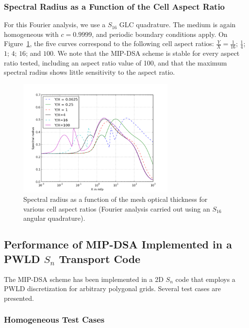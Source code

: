 \documentclass[preprint,10pt]{elsarticle}
\renewcommand{\(}{\left(}
\renewcommand{\)}{\right)}
\renewcommand{\[}{\left[}
\renewcommand{\]}{\right]}
\newcommand{\sn}{\ensuremath{S_n}\xspace}
\begin{document}
\subsubsection{Spectral Radius as a Function of the Cell Aspect Ratio}
For this Fourier analysis, we use a $S_{16}$ GLC quadrature. The medium is
again homogeneous with $c=0.9999$, and periodic boundary conditions apply. 
On Figure~\ref {fig_fa_ar}, the five curves correspond to the following cell aspect 
ratios: $\frac{Y}{X}=\frac{1}{16}$; $\frac{1}{4}$;
$1$; $4$; $16$; and $100$.
We note that the MIP-DSA scheme is stable for every aspect ratio tested, including an
aspect ratio value of 100, 
and that the maximum spectral radius shows little sensitivity to the aspect ratio.
\begin{figure}[!htbp]
  \centering
  \includegraphics[width=0.7\textwidth]{aspect_ratio_9999_2}
  \caption{Spectral radius as a function of the mesh optical thickness for various cell aspect ratios (Fourier analysis carried out using an $S_{16}$ angular quadrature).}
  \label{fig_fa_ar}
\end{figure}

\subsection{Performance of MIP-DSA Implemented in a PWLD $S_n$ Transport Code}
The MIP-DSA scheme has been implemented in a 2D \sn code that employs a PWLD discretization
for arbitrary polygonal grids. Several test cases are presented.

\subsubsection{Homogeneous Test Cases}  \label{sec_homog}
\end{document}
